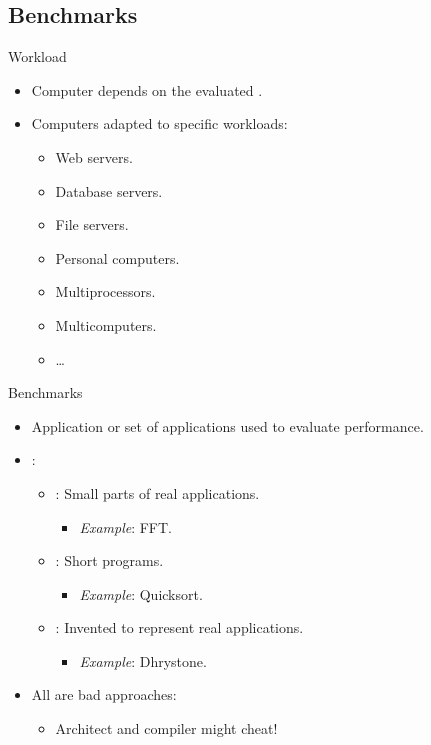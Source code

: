 \subsection{Benchmarks}

\begin{frame}[t]{Workload}
\begin{itemize}
  \item Computer  depends on the
        evaluated .

  \item Computers adapted to specific workloads:
    \begin{itemize}
      \item Web servers.
      \item Database servers.
      \item File servers.
      \item Personal computers.
      \item Multiprocessors.
      \item Multicomputers.
      \item \ldots
    \end{itemize}
\end{itemize}
\end{frame}

\begin{frame}[t]{Benchmarks}
\begin{itemize}
  \item Application or set of applications used to evaluate performance.

  \item {}:
    \begin{itemize}
      \item {}: Small parts of real applications.
        \begin{itemize}
          \item \emph{Example}: FFT.
        \end{itemize}
      \item {}: Short programs.
        \begin{itemize}
          \item \emph{Example}: Quicksort.
        \end{itemize}
      \item {}: 
            Invented to represent real applications.
        \begin{itemize}
          \item \emph{Example}: Dhrystone.
        \end{itemize}
    \end{itemize}

  \item All are bad approaches:
    \begin{itemize}
      \item \alert{Architect and compiler might cheat!}
    \end{itemize}
\end{itemize}
\end{frame}

